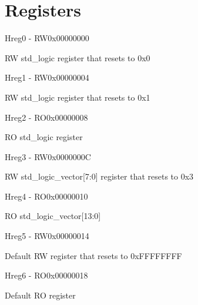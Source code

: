 \documentclass{article}
\begin{document}
\section{Registers}

\begin{register}{H}{reg0 - RW}{0x00000000}
  \par RW std{\_}logic register that resets to 0x0 \regnewline
  \label{reg0}
\regnewline
\end{register}

\begin{register}{H}{reg1 - RW}{0x00000004}
  \par RW std{\_}logic register that resets to 0x1 \regnewline
  \label{reg1}
\regnewline
\end{register}

\begin{register}{H}{reg2 - RO}{0x00000008}
  \par RO std{\_}logic register \regnewline
  \label{reg2}
\regnewline
\end{register}

\begin{register}{H}{reg3 - RW}{0x0000000C}
  \par RW std{\_}logic{\_}vector[7:0] register that resets to 0x3 \regnewline
  \label{reg3}
\regnewline
\end{register}

\begin{register}{H}{reg4 - RO}{0x00000010}
  \par RO std{\_}logic{\_}vector[13:0] \regnewline
  \label{reg4}
\regnewline
\end{register}

\begin{register}{H}{reg5 - RW}{0x00000014}
  \par Default RW register that resets to 0xFFFFFFFF \regnewline
  \label{reg5}
\regnewline
\end{register}

\begin{register}{H}{reg6 - RO}{0x00000018}
  \par Default RO register \regnewline
  \label{reg6}
\regnewline
\end{register}
\end{document}
